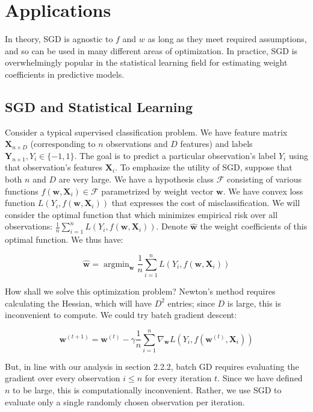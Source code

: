 \documentclass{article}
\DeclareMathOperator*{\argmin}{argmin}
\begin{document}
\section{Applications}

In theory, SGD is agnostic to $f$ and $w$ as long as they meet required
assumptions, and so can be used in many different areas of optimization. In
practice, SGD is overwhelmingly popular in the statistical learning
field for estimating weight coefficients in predictive models. 

\subsection{SGD and Statistical Learning}

Consider a typical supervised classification problem. We have
feature matrix $\bm{X}_{n \times D}$ (corresponding to $n$ observations and $D$
features) and labels $\bm{Y}_{n \times 1}, Y_i \in \{-1, 1\}$. The goal is to
predict a particular observation's label $Y_i$ using that observation's features
$\bm{X}_i$. To emphasize the utility of SGD, suppose that both $n$ and $D$ are
very large.
We have a hypothesis class $\mathcal{F}$ consisting of
various functions $f(\bm{w}, \bm{X}_i) \in \mathcal{F}$ parametrized by weight
vector $\bm{w}$. We have convex loss function $L(Y_i, f(\bm{w}, \bm{X}_i))$ that
expresses the cost of misclassification. 
We will consider the optimal function
that which minimizes empirical risk over all observations: $\frac{1}{n}
\sum_{i=1}^n L(Y_i, f(\bm{w}, \bm{X}_i))$.
Denote $\hat{\bm{w}}$ the weight coefficients of this optimal function. We thus
have:

\begin{equation}
	\hat{\bm{w}} = \argmin_{\bm{w}}\frac{1}{n} \sum_{i=1}^n L(Y_i, f(\bm{w}, \bm{X}_i))
\end{equation}

How shall we solve this optimization problem? Newton's method requires
calculating the Hessian, which will have $D^2$ entries; since $D$ is large,
this is inconvenient to compute. We could try batch gradient descent:

\begin{equation}
	\bm{w}^{(t+1)} = \bm{w}^{(t)} - \gamma \frac{1}{n}\sum_{i=1}^n
	\nabla_{\bm{w}} L(Y_i, f(\bm{w}^{(t)}, \bm{X}_i))
\end{equation}

But, in line with our analysis in section 2.2.2, batch GD requires evaluating
the gradient over every observation $i \leq n$ for every iteration $t$. Since we have defined $n$ to be
large, this is computationally inconvenient. Rather, we use SGD to evaluate only
a single randomly chosen observation per iteration.
\end{document}
